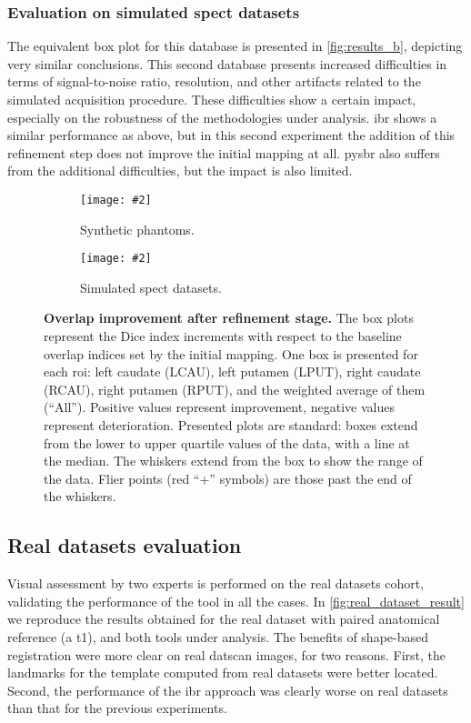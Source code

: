 \documentclass{frontiers}
\newcommand{\insertgraphic}[2]{\texttt{[image: \#2]}}
\newcommand{\insertgraphic}[2]{\texttt{[image: \#2]}}
\begin{document}
\subsubsection{Evaluation on simulated \gls*{spect} datasets}
\label{sec:results_simulated}
The equivalent box plot for this database is presented in \autoref{fig:results_b},
  depicting very similar conclusions.
This second database presents increased difficulties in terms of signal-to-noise
  ratio, resolution, and other artifacts related to the simulated acquisition
  procedure.
These difficulties show a certain impact, especially on the robustness of the
  methodologies under analysis.
\Gls*{ibr} shows a similar performance as above, but in this second experiment the addition
  of this refinement step does not improve the initial mapping at all.
\Gls*{pysbr} also suffers from the additional difficulties, but the impact is
  also limited.

\begin{figure*}[ht]
\centering 
\begin{subfigure}[b]{0.61\linewidth}
\insertgraphic{width=1.0\linewidth}{figures/05-results-phantoms}
\caption{\label{fig:results_a}
Synthetic phantoms.
}
\end{subfigure}
\hfill
\begin{subfigure}[b]{0.33\linewidth}
\insertgraphic{width=1.0\linewidth}{figures/05-results-simulated}
\caption{\label{fig:results_b}
Simulated \gls*{spect} datasets.
}
\end{subfigure}

\caption{\label{fig:results}
\textbf{Overlap improvement after refinement stage.}
The box plots represent the Dice index increments with respect to the baseline overlap
  indices set by the initial mapping. One box is presented for each \gls*{roi}:
  left caudate (LCAU), left putamen (LPUT), right caudate (RCAU), right putamen (RPUT),
  and the weighted average of them (``All''). Positive values represent improvement,
  negative values represent deterioration.
Presented plots are standard: boxes extend from the lower to upper quartile values
  of the data, with a line at the median. The whiskers extend from the box to show
  the range of the data. Flier points (red ``+'' symbols) are those past the end of
  the whiskers.
}
\end{figure*}

\subsection{Real datasets evaluation}
\label{sec:results_real}
Visual assessment by two experts is performed on the real datasets cohort,
  validating the performance of the tool in all the cases.
In \autoref{fig:real_dataset_result} we reproduce the results obtained
  for the real dataset with paired anatomical reference (a \gls*{t1}),
  and both tools under analysis.
The benefits of shape-based registration were more clear on real \gls*{datscan}
  images, for two reasons.
First, the landmarks for the template computed from real datasets were 
  better located.
Second, the performance of the \gls*{ibr} approach was clearly worse on
  real datasets than that for the previous experiments.
\end{document}

